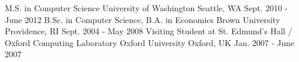 \begin{cventries}
  \cveducationentry
    {M.S. in Computer Science}
    {University of Washington}
    {Seattle, WA}
    {Sept. 2010 - June 2012}
    {}
  \cveducationentry
    {B.Sc. in Computer Science, B.A. in Economics}
    {Brown University}
    {Providence, RI}
    {Sept. 2004 - May 2008}
    {}
  \cveducationentry
    {Visiting Student at St. Edmund's Hall / Oxford Computing Laboratory}
    {Oxford University}
    {Oxford, UK}
    {Jan. 2007 - June 2007}
    {}
\end{cventries}
